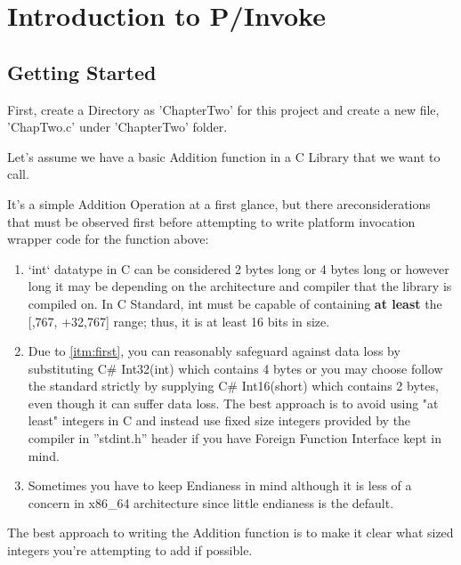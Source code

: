 \chapter{Introduction to P/Invoke}

\section{Getting Started}
First, create a Directory as 'ChapterTwo' for this project and create a new file, 'ChapTwo.c' under 'ChapterTwo' folder.

Let's assume we have a basic Addition function in a C Library that we want to call.



It's a simple Addition Operation at a first glance, but there are\newline considerations that must be observed first before attempting to write platform invocation wrapper code for the function above:

\begin{enumerate}
	\item \label{itm:first} `int` datatype in C can be considered 2 bytes long or 4 bytes long or however long it may be depending on the architecture and compiler that the library is compiled on. In C Standard, int must be capable of containing \textbf{at least} the [,767, +32,767] range; thus, it is at least 16 bits in size.
	
	\item Due to \ref{itm:first}, you can reasonably safeguard against data loss by substituting C\# Int32(int) which contains 4 bytes or you may choose follow the standard strictly by supplying C\# Int16(short) which contains 2 bytes, even though it can suffer data loss. The best approach is to avoid using "at least" integers in C and instead use fixed size integers provided by the compiler in ''stdint.h'' header if you have Foreign Function Interface kept in mind.
	
	\item Sometimes you have to keep Endianess in mind although it is less of a concern in x86\_64 architecture since little endianess is the default.
\end{enumerate}
The best approach to writing the Addition function is to make it clear what sized integers you're attempting to add  if possible.



